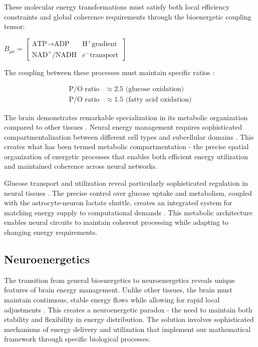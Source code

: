 These molecular energy transformations must satisfy both local efficiency constraints and global coherence requirements through the bioenergetic coupling tensor:

$B_{\mu\nu} = \begin{bmatrix} 
\text{ATP}\rightarrow\text{ADP} & \text{H}^+\text{gradient} \\
\text{NAD}^+\text{/NADH} & e^-\text{transport}
\end{bmatrix}$

The coupling between these processes must maintain specific ratios \cite{Rolfe1997}:

\begin{align}
\text{P/O ratio} &\approx 2.5 \text{ (glucose oxidation)} \\
\text{P/O ratio} &\approx 1.5 \text{ (fatty acid oxidation)}
\end{align}

The brain demonstrates remarkable specialization in its metabolic organization compared to other tissues \cite{Berndt2012}. Neural energy management requires sophisticated compartmentalization between different cell types and subcellular domains \cite{Shulman2004}. This creates what has been termed metabolic compartmentation - the precise spatial organization of energetic processes that enables both efficient energy utilization and maintained coherence across neural networks.

Glucose transport and utilization reveal particularly sophisticated regulation in neural tissues \cite{Szablewski2017}. The precise control over glucose uptake and metabolism, coupled with the astrocyte-neuron lactate shuttle, creates an integrated system for matching energy supply to computational demands \cite{Pellerin2012}. This metabolic architecture enables neural circuits to maintain coherent processing while adapting to changing energy requirements.

\subsection{Neuroenergetics}

The transition from general bioenergetics to neuroenergetics reveals unique features of brain energy management. Unlike other tissues, the brain must maintain continuous, stable energy flows while allowing for rapid local adjustments \cite{DiNuzzo2017}. This creates a neuroenergetic paradox - the need to maintain both stability and flexibility in energy distribution. The solution involves sophisticated mechanisms of energy delivery and utilization that implement our mathematical framework through specific biological processes.

